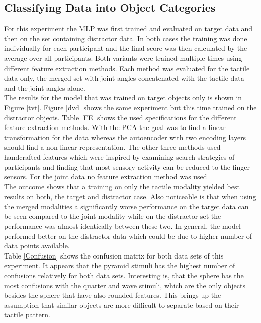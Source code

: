 \subsection{Classifying Data into Object Categories}\label{e2}
For this experiment the MLP was first trained and evaluated on target data and then on the set containing distractor data. In both cases the training was done individually for each participant and the final score was then calculated by the average over all participants. Both variants were trained multiple times using different feature extraction methods. Each method was evaluated for the tactile data only, the merged set with joint angles concatenated with the tactile data and the joint angles alone.\\ 
The results for the model that was trained on target objects only is shown in Figure \ref{tvt}. Figure \ref{dvd} shows the same experiment but this time trained on the distractor objects. Table \ref{FE} shows the used specifications for the different feature extraction methods. With the PCA the goal was to find a linear transformation for the data whereas the autoencoder with two encoding layers should find a non-linear representation. The other three methods used handcrafted features which were inspired by examining search strategies of participants and finding that most sensory activity can be reduced to the finger sensors. For the joint data no feature extraction method was used \\
The outcome shows that a training on only the tactile modality yielded best results on both, the target and distractor case. Also noticeable is that when using the merged modalities a significantly worse performance on the target data can be seen compared to the joint modality while on the distractor set the performance was almost identically between these two. In general, the model performed better on the distractor data which could be due to higher number of data points available.\\
Table \ref{Confusion} shows the confusion matrix for both data sets of this experiment. It appears that the pyramid stimuli has the highest number of confusions relatively for both data sets. Interesting is, that the sphere has the most confusions with the quarter and wave stimuli, which are the only objects besides the sphere that have also rounded features. This brings up the assumption that similar objects are more difficult to separate based on their tactile pattern. 

